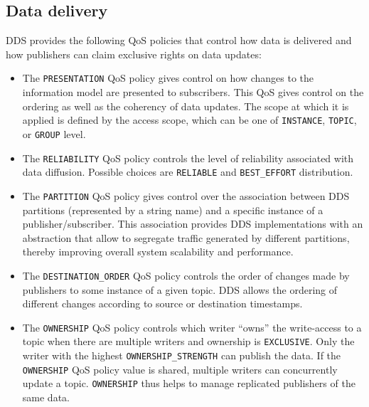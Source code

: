 \subsection{Data delivery} 
DDS provides the following QoS policies that control how data is
delivered and how publishers can claim exclusive rights on data
updates:
\begin{itemize}
	\item The \texttt{PRESENTATION} QoS policy gives control on
          how changes to the information model are presented to
          subscribers. This \ac{QoS} gives control on the ordering as
          well as the coherency of data updates.  The scope at which
          it is applied is defined by the access scope, which can be
          one of \texttt{INSTANCE}, \texttt{TOPIC}, or \texttt{GROUP}
          level.

	\item The \texttt{RELIABILITY} QoS policy controls the level
          of reliability associated with data diffusion. Possible
          choices are \texttt{RELIABLE} and \texttt{BEST\_EFFORT}
          distribution.

	\item The \texttt{PARTITION} \ac{QoS} policy gives control
          over the association between \ac{DDS} partitions
          (represented by a string name) and a specific instance of a
          publisher/subscriber.  This association provides \ac{DDS}
          implementations with an abstraction that allow to segregate
          traffic generated by different partitions, thereby improving
          overall system scalability and performance.
	
 	\item The \texttt{DESTINATION\_ORDER} \ac{QoS} policy controls
          the order of changes made by publishers to some instance of
          a given topic. DDS allows the ordering of different changes
          according to source or destination timestamps.

	\item The \texttt{OWNERSHIP} \ac{QoS} policy controls which
          writer ``owns'' the write-access to a topic when there are
          multiple writers and ownership is \texttt{EXCLUSIVE}. Only
          the writer with the highest \texttt{OWNERSHIP\_STRENGTH} can
          publish the data.  If the \texttt{OWNERSHIP} \ac{QoS} policy
          value is shared, multiple writers can concurrently update a
          topic. \texttt{OWNERSHIP} thus helps to manage replicated
          publishers of the same data.
	
\end{itemize}
